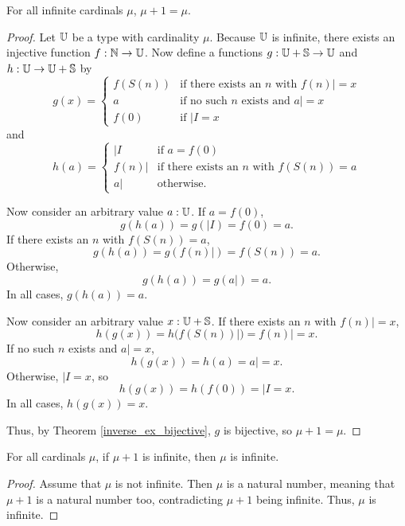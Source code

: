\documentclass[../../math.tex]{subfiles}
\begin{document}
\begin{lemma} \label{card_inf_plus_one}
    For all infinite cardinals $\mu$, $\mu + 1 = \mu$.
\end{lemma}
\begin{proof}
    Let $\mathbb{U}$ be a type with cardinality $\mu$.  Because $\mathbb{U}$ is infinite, there
    exists an injective function $f : \mathbb{N} \to \mathbb{U}$.  Now define a functions $g :
    \mathbb{U} + \mathbb{S} \to \mathbb{U}$ and $h : \mathbb{U} \to \mathbb{U} + \mathbb{S}$ by
    \[
        g(x) = \begin{cases}
            f(S(n)) & \text{if there exists an $n$ with $f(n)| = x$} \\
            a       & \text{if no such $n$ exists and $a| = x$} \\
            f(0)    & \text{if $|I = x$}
        \end{cases}
    \]
    and
    \[
        h(a) = \begin{cases}
            |I    & \text{if $a = f(0)$} \\
            f(n)| & \text{if there exists an $n$ with $f(S(n)) = a$} \\
            a|    & \text{otherwise.}
        \end{cases}
    \]

    Now consider an arbitrary value $a : \mathbb{U}$.  If $a = f(0)$,
    \[
        g(h(a)) = g(|I) = f(0) = a.
    \]
    If there exists an $n$ with $f(S(n)) = a$,
    \[
        g(h(a)) = g(f(n)|) = f(S(n)) = a.
    \]
    Otherwise,
    \[
        g(h(a)) = g(a|) = a.
    \]
    In all cases, $g(h(a)) = a$.

    Now consider an arbitrary value $x : \mathbb{U} + \mathbb{S}$.  If there exists an $n$ with
    $f(n)| = x$,
    \[
        h(g(x)) = h(f(S(n))|) = f(n)| = x.
    \]
    If no such $n$ exists and $a| = x$,
    \[
        h(g(x)) = h(a) = a| = x.
    \]
    Otherwise, $|I = x$, so
    \[
        h(g(x)) = h(f(0)) = |I = x.
    \]
    In all cases, $h(g(x)) = x$.

    Thus, by Theorem \ref{inverse_ex_bijective}, $g$ is bijective, so $\mu + 1 =
    \mu$.
\end{proof}

\begin{lemma} \label{card_inf_minus_one_inf}
    For all cardinals $\mu$, if $\mu + 1$ is infinite, then $\mu$ is infinite.
\end{lemma}
\begin{proof}
    Assume that $\mu$ is not infinite.  Then $\mu$ is a natural number, meaning
    that $\mu + 1$ is a natural number too, contradicting $\mu + 1$ being
    infinite.  Thus, $\mu$ is infinite.
\end{proof}
\end{document}
